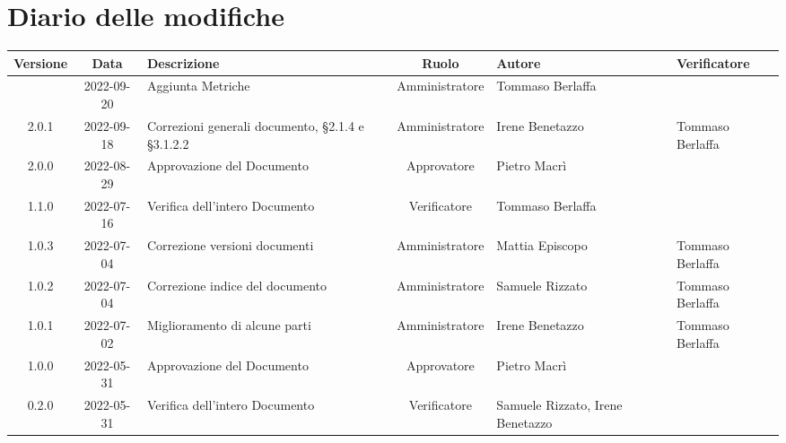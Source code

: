 \section*{Diario delle modifiche}
	\begin{center}
	\renewcommand{\arraystretch}{1.8} %
	\begin{longtable}{ |c|c|p{8em}|c|m{5em}|m{6em}| }
	\hline
	\textbf{Versione} & \textbf{Data} & \textbf{Descrizione} &  \textbf{Ruolo} &  \textbf{Autore} & \textbf{Verificatore}\\ %
	\hline %
  & 2022-09-20 & Aggiunta \newline Metriche & Amministratore & Tommaso \newline Berlaffa & \\
	\hline
	2.0.1 & 2022-09-18 & Correzioni generali documento, §2.1.4 e §3.1.2.2 & Amministratore & Irene \newline Benetazzo & Tommaso \newline Berlaffa\\
	\hline
	2.0.0 & 2022-08-29 & Approvazione del Documento & Approvatore & Pietro \newline Macrì & \\
	\hline
  	1.1.0 & 2022-07-16 & Verifica dell'intero Documento & Verificatore & Tommaso Berlaffa &  \\
	\hline
	1.0.3 & 2022-07-04 & Correzione versioni documenti & Amministratore & Mattia \newline Episcopo & Tommaso Berlaffa \\
	\hline
	1.0.2 & 2022-07-04 & Correzione indice del documento & Amministratore & Samuele \newline Rizzato & Tommaso Berlaffa \\
	\hline
	1.0.1 & 2022-07-02 & Miglioramento di alcune parti & Amministratore & Irene \newline Benetazzo & Tommaso Berlaffa \\
    \hline
	1.0.0 & 2022-05-31 & Approvazione del Documento & Approvatore & Pietro \newline Macrì & \\
	\hline
	0.2.0 & 2022-05-31 & Verifica dell'intero Documento & Verificatore & Samuele \newline Rizzato, Irene \newline Benetazzo & \\

\end{longtable}
\end{center}
